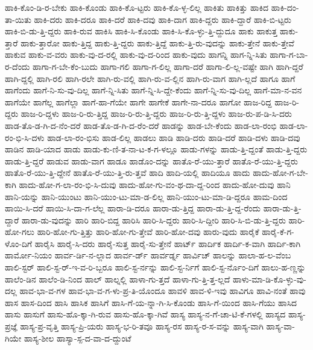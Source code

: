 {ಹಾಕಿ-ಕೊಂ-ಡಿ-ರ-ಬೇಕು
ಹಾಕಿ-ಕೊಂಡು
ಹಾಕಿ-ಕೊ-ಟ್ಟರು
ಹಾಕಿ-ಕೊ-ಳ್ಳ-ಲಿಲ್ಲ
ಹಾಕಿತು
ಹಾಕಿತ್ತು
ಹಾಕಿದ
ಹಾಕಿ-ದಂ-ತಾ-ಯಿತು
ಹಾಕಿ-ದರು
ಹಾಕಿ-ದರೂ
ಹಾಕಿ-ದರೆ
ಹಾಕಿ-ದವು
ಹಾಕಿ-ದಾಗ
ಹಾಕಿ-ದ್ದರು
ಹಾಕಿ-ದ್ದಾರೆ
ಹಾಕಿ-ಬಿ-ಟ್ಟರು
ಹಾಕಿ-ಬಿ-ಡು-ತ್ತಿ-ದ್ದರು
ಹಾಕಿ-ರುವ
ಹಾಕಿಸಿ
ಹಾಕಿ-ಸಿ-ಕೊಂಡು
ಹಾಕಿ-ಸಿ-ಕೊ-ಳ್ಳು-ತ್ತಿ-ದ್ದುದೂ
ಹಾಕು
ಹಾಕುತ್ತ
ಹಾಕು-ತ್ತಾರೆ
ಹಾಕು-ತ್ತಾರೋ
ಹಾಕು-ತ್ತಿದ್ದ
ಹಾಕು-ತ್ತಿ-ದ್ದರು
ಹಾಕು-ತ್ತಿದ್ದೆ
ಹಾಕು-ತ್ತಿ-ರು-ವುದನ್ನು
ಹಾಕು-ತ್ತೇನೆ
ಹಾಕು-ತ್ತೇವೆ
ಹಾಕುವ
ಹಾಕು-ವ-ವರು
ಹಾಕು-ವು-ದ-ರಲ್ಲಿ
ಹಾಕು-ವು-ದ-ರಿಂದ
ಹಾಕು-ವುದು
ಹಾಗನ್ನಿ
ಹಾಗ-ನ್ನಿ-ಸಿತು
ಹಾಗಾ-ಗ-ಬಾ-ರ-ದೆಂದು
ಹಾಗಾ-ಗ-ಬೇ-ಕೆಂ-ಬುದು
ಹಾಗಾ-ಗಲಿ
ಹಾಗಾ-ಗ-ಲಿಲ್ಲ
ಹಾಗಾ-ದರೆ
ಹಾಗಾ-ಲಿ-ಲ್ಲ-ವಷ್ಟೇ
ಹಾಗಿ
ಹಾಗಿ-ದ್ದರೆ
ಹಾಗಿ-ದ್ದಲ್ಲಿ
ಹಾಗಿ-ರಲಿ
ಹಾಗಿ-ರಲೇ
ಹಾಗಿ-ರು-ವಲ್ಲಿ
ಹಾಗಿ-ರು-ವ-ಲ್ಲಿನ
ಹಾಗಿ-ರು-ವಾಗ
ಹಾಗಿ-ಲ್ಲದೆ
ಹಾಗೂ
ಹಾಗೆ
ಹಾಗೆಂದು
ಹಾಗೆ-ನಿ-ಸು-ವು-ದಿಲ್ಲ
ಹಾಗೆ-ನ್ನಿ-ಸಿತು
ಹಾಗೆ-ನ್ನಿ-ಸಿ-ದ್ದೇ-ಕೆಂದು
ಹಾಗೆ-ನ್ನಿ-ಸು-ವು-ದಿಲ್ಲ
ಹಾಗೆ-ಮಾ-ನ-ವನ
ಹಾಗೆಯೇ
ಹಾಗೆಲ್ಲ
ಹಾಗೆಲ್ಲಾ
ಹಾಗೆ-ಹಾ-ಗೆಯೇ
ಹಾಗೇ
ಹಾಗೇಕೆ
ಹಾಗೇ-ನಾ-ದರೂ
ಹಾಗೋ
ಹಾಜ-ರಿದ್ದ
ಹಾಜ-ರಿ-ದ್ದರು
ಹಾಜ-ರಿ-ದ್ದಳು
ಹಾಜ-ರಿ-ರು-ತ್ತಿದ್ದ
ಹಾಜ-ರಿ-ರು-ತ್ತಿ-ದ್ದರು
ಹಾಜ-ರಿ-ರು-ತ್ತಿ-ದ್ದಳು
ಹಾಜ-ರು-ಪ-ಡಿ-ಸಿ-ದರು
ಹಾಡ-ತೊ-ಡ-ಗಿ-ದ-ನೆಂ-ದರೆ
ಹಾಡ-ತೊ-ಡ-ಗಿ-ದ-ರೆಂ-ದರೆ
ಹಾಡನ್ನು
ಹಾಡ-ಬೇ-ಕೆಂದು
ಹಾಡ-ಲಾ-ರಂಭಿ
ಹಾಡ-ಲಾ-ರಂ-ಭಿ-ಸಿ-ದಳು
ಹಾಡ-ಲಾ-ರಂ-ಭಿಸು
ಹಾಡ-ಲಿಲ್ಲ
ಹಾಡಲು
ಹಾಡಿ
ಹಾಡಿ-ದರು
ಹಾಡಿ-ದರೆ
ಹಾಡಿ-ದಳು
ಹಾಡಿ-ದವು
ಹಾಡಿನ
ಹಾಡಿ-ಯಾದ
ಹಾಡು
ಹಾಡು-ಕು-ಣಿ-ತ-ನಾ-ಟ-ಕ-ಗ-ಳಲ್ಲೂ
ಹಾಡು-ಗಳನ್ನು
ಹಾಡು-ತ್ತಿ-ದ್ದಂತೆ
ಹಾಡು-ತ್ತಿ-ದ್ದರು
ಹಾಡು-ತ್ತಿ-ದ್ದರೆ
ಹಾಡುವ
ಹಾಡು-ವಾಗ
ಹಾಡೂ
ಹಾಡೊಂ-ದನ್ನು
ಹಾತೊ-ರೆ-ಯು-ತ್ತಾರೆ
ಹಾತೊ-ರೆ-ಯು-ತ್ತಿ-ದ್ದರು
ಹಾತೊ-ರೆ-ಯು-ತ್ತಿ-ದ್ದೇನೆ
ಹಾತೊ-ರೆ-ಯು-ತ್ತಿ-ರು-ತ್ತವೆ
ಹಾದಿ
ಹಾದಿ-ಯಲ್ಲಿ
ಹಾದಿಯೂ
ಹಾದು
ಹಾದು-ಹೋ-ಗ-ಬೇ-ಕಾಗಿ
ಹಾದು-ಹೋ-ಗ-ಲಾ-ರಂ-ಭಿ-ಸಿ-ದುವು
ಹಾದು-ಹೋ-ಗು-ವಂ-ಥ-ದಾ-ದ್ದ-ರಿಂದ
ಹಾದು-ಹೋ-ದುವು
ಹಾನಿ
ಹಾನಿ-ಯನ್ನು
ಹಾನಿ-ಯುಂಟು
ಹಾನಿ-ಯುಂ-ಟು-ಮಾ-ಡ-ಲಿಲ್ಲ
ಹಾನಿ-ಯುಂ-ಟು-ಮಾ-ಡಿ-ದ್ದರೂ
ಹಾಮ-ದಿಂದ
ಹಾಯಿ-ಸಿ-ದರೆ
ಹಾಯಿ-ಸಿ-ದಾ-ಗ-ಲೆಲ್ಲ
ಹಾರಾ-ಡಿ-ದರೂ
ಹಾರಾ-ಡು-ತ್ತಿದ್ದ
ಹಾರಾ-ಡು-ತ್ತಿ-ದ್ದ-ರೆಂದು
ಹಾರಾ-ಡು-ತ್ತಿ-ದ್ದಾರೆ
ಹಾರಾ-ಡು-ವುದನ್ನು
ಹಾರಿ
ಹಾರಿ-ಬಿದ್ದ
ಹಾರಿಸಿ
ಹಾರಿ-ಸಿ-ದ್ದರು
ಹಾರಿ-ಸಿ-ದ್ದೀರಿ
ಹಾರಿ-ಸಿ-ಬಿ-ಡು-ತ್ತಿ-ದ್ದರು
ಹಾರಿ-ಹೋ-ಗಲು
ಹಾರಿ-ಹೋ-ಗು-ತ್ತಿತ್ತು
ಹಾರಿ-ಹೋ-ಗು-ತ್ತೇವೆ
ಹಾರಿ-ಹೋ-ದವು
ಹಾರು-ವುದು
ಹಾರೈಕೆ
ಹಾರೈ-ಕೆ-ಗ-ಳೊಂ-ದಿಗೆ
ಹಾರೈಸಿ
ಹಾರೈ-ಸಿ-ದರು
ಹಾರೈ-ಸುತ್ತ
ಹಾರೈ-ಸು-ತ್ತೇನೆ
ಹಾರ್ಟ್
ಹಾರ್ದಿಕ
ಹಾರ್ದಿ-ಕ-ವಾಗಿ
ಹಾರ್ದಿ-ಕಾಗಿ
ಹಾರ್ಮೋ-ನಿಯಂ
ಹಾರ್ವ-ರ್ಡಿ-ನ-ಲ್ಲಾದ
ಹಾರ್ವ-ರ್ಡ್
ಹಾರ್ವರ್ಡ್ನ
ಹಾರ್ವಿಚ್
ಹಾಲನ್ನು
ಹಾಲಾ-ಹ-ಲ-ವೆಂಬ
ಹಾಲಿ-ಸ್ಟರ್
ಹಾಲಿ-ಸ್ಟ-ರ್-ಇ-ವ-ರಿ-ಬ್ಬರೂ
ಹಾಲಿ-ಸ್ಟ-ರ್ನನ್ನು
ಹಾಲಿ-ಸ್ಟ-ರ್ನಿಗೆ
ಹಾಲಿ-ಸ್ಟ-ರ್ನೊಂ-ದಿಗೆ
ಹಾಲು-ಹ-ಣ್ಣನ್ನು
ಹಾಲೆಂ-ಡಿನ
ಹಾಲೆಂ-ಡಿ-ನಿಂದ
ಹಾಲ್
ಹಾಲ್ನಲ್ಲಿ
ಹಾಳಾ-ಗು-ತ್ತದೆ
ಹಾಳಾ-ಗು-ತ್ತಿ-ತ್ತ-ಲ್ಲದೆ
ಹಾಳು-ಮಾ-ಡಿ-ಕೊ-ಳ್ಳು-ವು-ದಲ್ಲ
ಹಾವ-ಭಾ-ವ-ಗಳ
ಹಾವ-ಭಾ-ವ-ಗ-ಳು-ಪ್ರ-ತಿ-ಯೊಂದೂ
ಹಾವಳಿ
ಹಾವ-ಳಿ-ಇವು
ಹಾವಿಗೂ
ಹಾವಿ-ನಂತೆ
ಹಾವು
ಹಾಸ
ಹಾಸ-ದಿಂದ
ಹಾಸಿ
ಹಾಸಿಕ
ಹಾಸಿಗೆ
ಹಾಸಿ-ಗೆ-ಯ-ನ್ನಾ-ಗಿ-ಸಿ-ಕೊಂಡು
ಹಾಸಿ-ಗೆ-ಯಿಂದ
ಹಾಸಿ-ಗೆಯು
ಹಾಸಿದ
ಹಾಸು
ಹಾಸುಗೆ
ಹಾಸು-ಹೊ-ಕ್ಕಾ-ಗಿ-ರುವ
ಹಾಸು-ಹೊ-ಕ್ಕಾ-ಗಿವೆ
ಹಾಸ್ಯ
ಹಾಸ್ಯ-ನ-ಗೆ-ಚಾ-ಟಿ-ಕೆ-ಗಳಲ್ಲಿ
ಹಾಸ್ಯದ
ಹಾಸ್ಯ-ಪ್ರಜ್ಞೆ
ಹಾಸ್ಯ-ಪ್ರ-ವೃತ್ತಿ
ಹಾಸ್ಯ-ಪ್ರಿ-ಯರು
ಹಾಸ್ಯ-ಭ-ರಿ-ತವೂ
ಹಾಸ್ಯ-ರಸ
ಹಾಸ್ಯ-ರ-ಸ-ವನ್ನು
ಹಾಸ್ಯ-ವಾಗಿ
ಹಾಸ್ಯ-ವಾ-ಗಿಯೇ
ಹಾಸ್ಯ-ಶೀಲ
ಹಾಸ್ಯಾ-ಸ್ಪ-ದ-ವಾ-ದ-ದ್ದುಂಟೆ
}

